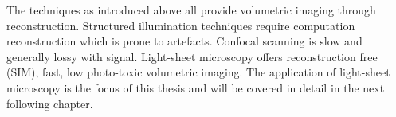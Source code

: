 The techniques as introduced above all provide volumetric imaging through reconstruction.
Structured illumination techniques require computation reconstruction which is prone to artefacts.
Confocal scanning is slow and generally lossy with signal.
Light-sheet microscopy offers reconstruction free (SIM), fast, low photo-toxic volumetric imaging.
The application of light-sheet microscopy is the focus of this thesis and will be covered in detail in the next following chapter.


